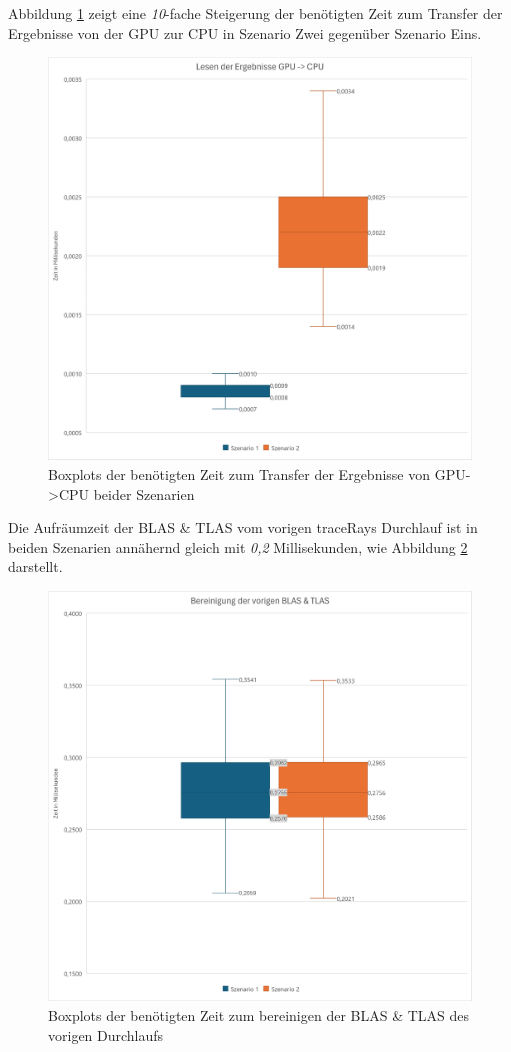 \documentclass[11pt]{scrartcl}
\begin{document}
	\pagebreak
	
	Abbildung \ref{fig:resultscomp} zeigt eine \textit{10}-fache Steigerung der benötigten Zeit zum Transfer der Ergebnisse von der GPU zur CPU in Szenario Zwei gegenüber Szenario Eins.
	
	\begin{figure}[h!]
		\centering
		\includegraphics[width=0.7\linewidth]{Figures/rt_resultread_comp.png}
		\caption[Szenarienvergleich Transfer der Ergebnisse GPU->CPU]{Boxplots der benötigten Zeit zum Transfer der Ergebnisse von GPU->CPU beider Szenarien}
		\label{fig:resultscomp}
	\end{figure}
	
	\pagebreak
	
	
	Die Aufräumzeit der BLAS \& TLAS vom vorigen traceRays Durchlauf ist in beiden Szenarien annähernd gleich mit \textit{0,2} Millisekunden, wie Abbildung \ref{fig:cleanupcomp} darstellt.
	
	\begin{figure}[h!]
		\centering
		\includegraphics[width=0.7\linewidth]{Figures/rt_previous_cleanup.png}
		\caption[Szenarienvergleich Bereinigung voriger BLAS \& TLAS]{Boxplots der benötigten Zeit zum bereinigen der BLAS \& TLAS des vorigen Durchlaufs}
		\label{fig:cleanupcomp}
	\end{figure}
	
\end{document}
